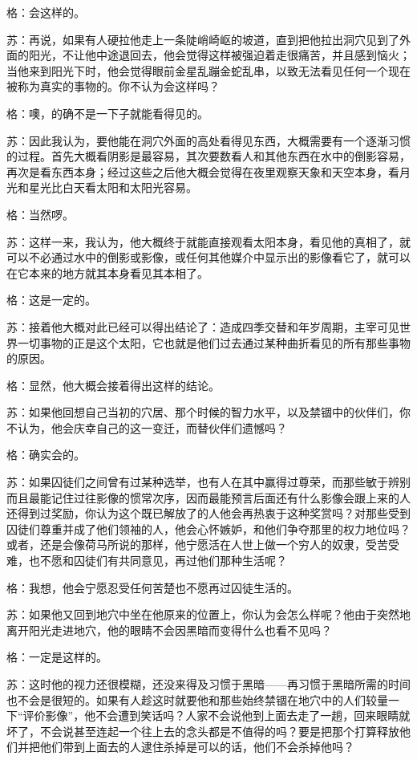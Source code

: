\documentclass[12pt,oneside]{book}
\begin{document}
格：会这样的。

苏：再说，如果有人硬拉他走上一条陡峭崎岖的坡道，直到把他拉出洞穴见到了外面的阳光，不让他中途退回去，他会觉得这样被强迫着走很痛苦，并且感到恼火；当他来到阳光下时，他会觉得眼前金星乱蹦金蛇乱串，以致无法看见任何一个现在被称为真实的事物的。你不认为会这样吗？

格：噢，的确不是一下子就能看得见的。

苏：因此我认为，要他能在洞穴外面的高处看得见东西，大概需要有一个逐渐习惯的过程。首先大概看阴影是最容易，其次要数看人和其他东西在水中的倒影容易，再次是看东西本身；经过这些之后他大概会觉得在夜里观察天象和天空本身，看月光和星光比白天看太阳和太阳光容易。

格：当然啰。

苏：这样一来，我认为，他大概终于就能直接观看太阳本身，看见他的真相了，就可以不必通过水中的倒影或影像，或任何其他媒介中显示出的影像看它了，就可以在它本来的地方就其本身看见其本相了。

格：这是一定的。

苏：接着他大概对此已经可以得出结论了：造成四季交替和年岁周期，主宰可见世界一切事物的正是这个太阳，它也就是他们过去通过某种曲折看见的所有那些事物的原因。

格：显然，他大概会接着得出这样的结论。

苏：如果他回想自己当初的穴居、那个时候的智力水平，以及禁锢中的伙伴们，你不认为，他会庆幸自己的这一变迁，而替伙伴们遗憾吗？

格：确实会的。

苏：如果囚徒们之间曾有过某种选举，也有人在其中赢得过尊荣，而那些敏于辨别而且最能记住过往影像的惯常次序，因而最能预言后面还有什么影像会跟上来的人还得到过奖励，你认为这个既已解放了的人他会再热衷于这种奖赏吗？对那些受到囚徒们尊重并成了他们领袖的人，他会心怀嫉妒，和他们争夺那里的权力地位吗？或者，还是会像荷马所说的那样，他宁愿活在人世上做一个穷人的奴隶，受苦受难，也不愿和囚徒们有共同意见，再过他们那种生活呢？

格：我想，他会宁愿忍受任何苦楚也不愿再过囚徒生活的。

苏：如果他又回到地穴中坐在他原来的位置上，你认为会怎么样呢？他由于突然地离开阳光走进地穴，他的眼睛不会因黑暗而变得什么也看不见吗？

格：一定是这样的。

苏：这时他的视力还很模糊，还没来得及习惯于黑暗——再习惯于黑暗所需的时间也不会是很短的。如果有人趁这时就要他和那些始终禁锢在地穴中的人们较量一下“评价影像”，他不会遭到笑话吗？人家不会说他到上面去走了一趟，回来眼睛就坏了，不会说甚至连起一个往上去的念头都是不值得的吗？要是把那个打算释放他们并把他们带到上面去的人逮住杀掉是可以的话，他们不会杀掉他吗？
\end{document}
